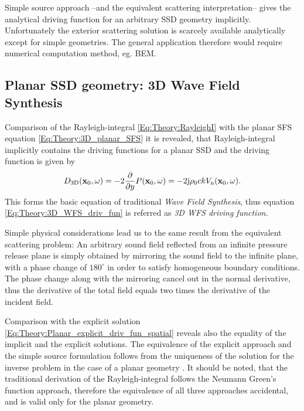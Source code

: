 Simple source approach --and the equivalent scattering interpretation-- gives the analytical driving function for an arbitrary SSD geometry implicitly. Unfortunately the exterior scattering solution is scarcely available analytically except for simple geometries. The general application therefore would require numerical computation method, eg. BEM. %

\subsection{Planar SSD geometry: 3D Wave Field Synthesis}

Comparison of the Rayleigh-integral \eqref{Eq:Theory:RayleighI} with the planar SFS equation \eqref{Eq:Theory:3D_planar_SFS} it is revealed, that Rayleigh-integral implicitly contains the driving functions for a planar SSD and the driving function is given by
\begin{equation}
D_{\mathrm{3D}}(\mathbf{x}_0,\omega) = -2\frac{\partial}{\partial y} P(\mathbf{x}_0,\omega) = - 2 \mathrm{j} \rho_0 c k V_{\mathrm{n}}(\mathbf{x}_0,\omega).
\label{Eq:Theory:3D_WFS_driv_fun}
\end{equation}
This forms the basic equation of traditional \emph{Wave Field Synthesis}, thus equation \eqref{Eq:Theory:3D_WFS_driv_fun} is referred as \emph{3D WFS driving function}.

Simple physical considerations lead us to the same result from the equivalent scattering problem:
An arbitrary sound field reflected from an infinite pressure release plane is simply obtained by mirroring the sound field to the infinite plane, with a phase change of $180^{\circ}$ in order to satisfy homogeneous boundary conditions. The phase change along with the mirroring cancel out in the normal derivative, thus the derivative of the total field equals two times the derivative of the incident field.

Comparison with the explicit solution \eqref{Eq:Theory:Planar_explicit_driv_fun_spatial} reveals also the equality of the implicit and the explicit solutions.
The equivalence of the explicit approach and the simple source formulation follows from the uniqueness of the solution for the inverse problem in the case of a planar geometry \cite{Fazi2010}.
It should be noted, that the traditional derivation of the Rayleigh-integral follows the Neumann Green's function approach, therefore the equivalence of all three approaches accidental, and is valid only for the planar geometry.


